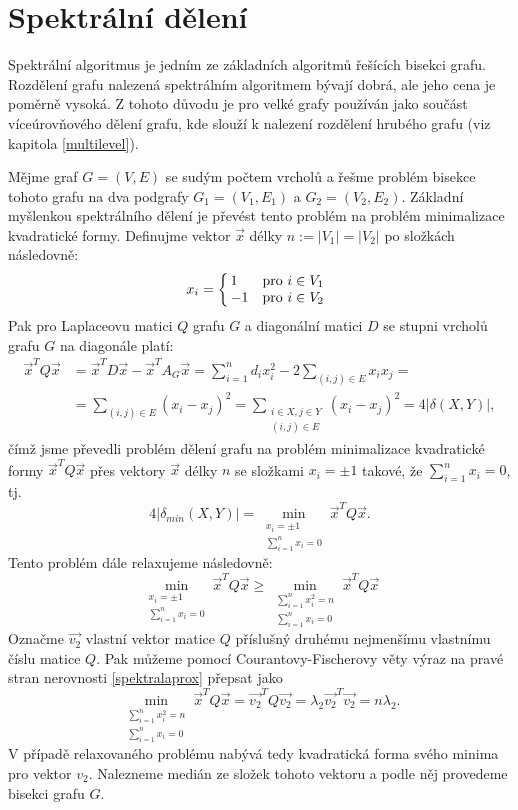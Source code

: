 \documentclass[11pt,american,czech,oneside]{book}
\theoremstyle{plain}
\theoremstyle{definition}
\begin{document}
\section{Spektrální dělení}
\label{spektral}

Spektrální algoritmus je jedním ze základních algoritmů řešících bisekci grafu. Rozdělení grafu nalezená spektrálním algoritmem bývají dobrá, ale jeho cena je poměrně vysoká. Z tohoto důvodu je pro velké grafy používán jako součást víceúrovňového dělení grafu, kde slouží k nalezení rozdělení hrubého grafu (viz kapitola \ref{multilevel}).

Mějme graf $G=(V,E)$ se sudým počtem vrcholů a řešme problém bisekce tohoto grafu na dva podgrafy $G_1=(V_1,E_1)$ a $G_2=(V_2,E_2)$. Základní myšlenkou spektrálního dělení je převést tento problém na problém minimalizace kvadratické formy.
Definujme vektor $\vec{x}$ délky $n:=|V_1|=|V_2|$ po složkách následovně:
\[
x_i =
\left\{
	\begin{array}{@{\,}ll}
		1  & \mbox{pro } i \in V_1 \\
		-1 & \mbox{pro } i \in V_2
	\end{array}
\right.
\]
Pak pro Laplaceovu matici $Q$ grafu $G$ a diagonální matici $D$ se stupni vrcholů grafu $G$ na diagonále platí:
\begin{align*}
  \vec{x}^T Q \vec{x} &= \vec{x}^T D \vec{x} - \vec{x}^T A_G \vec{x} = \sum_{i=1}^{n}d_i x_i^2 - 2 \sum_{(i,j)\in E} x_i x_j = \\
&=\sum_{(i,j)\in E}(x_i-x_j)^2 =
\sum\limits_{\substack{i \in X, j \in Y \\ (i,j)\in E}}(x_i-x_j)^2 =
4|\delta(X, Y)|,
\end{align*}
\noindent
čímž jsme převedli problém dělení grafu na problém minimalizace kvadratické formy $\vec{x}^T Q \vec{x}$ přes vektory $\vec{x}$ délky $n$ se složkami $x_i = \pm 1$ takové, že $\sum_{i=1 }^{n}x_i = 0$, tj.
\[
4 |\delta_{min}(X, Y)| = \min_{\substack{x_i = \pm 1 \\ \sum_{i=1 }^{n}x_i = 0}} \vec{x}^T Q \vec{x}.
\]
Tento problém dále relaxujeme následovně:
\begin{equation}\label{spektralaprox}
\min_{\substack{x_i = \pm 1 \\ \sum_{i=1 }^{n}x_i = 0}} \vec{x}^T Q \vec{x} \geq \min_{\substack{\sum_{i=1}^{n}x_i^2 = n \\ \sum_{i=1 }^{n}x_i = 0}} \vec{x}^T Q \vec{x}
\end{equation}
Označme $\vec{v_2}$ vlastní vektor matice $Q$ příslušný druhému nejmenšímu vlastnímu číslu matice $Q$. Pak můžeme pomocí Courantovy-Fischerovy věty \cite{hojo:85} výraz na pravé stran nerovnosti \ref{spektralaprox} přepsat jako
\[
\min_{\substack{\sum_{i=1}^{n}x_i^2 = n \\ \sum_{i=1 }^{n}x_i = 0}} \vec{x}^T Q \vec{x} = \vec{v_2}^T Q \vec{v_2} = \lambda_2 \vec{v_2}^T \vec{v_2} = n \lambda_2.
\]
V případě relaxovaného problému nabývá tedy kvadratická forma svého minima pro vektor $v_2$. Nalezneme medián ze složek tohoto vektoru a podle něj provedeme bisekci grafu $G$.
\end{document}
